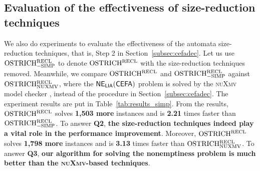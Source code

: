 \subsection{Evaluation of the effectiveness of size-reduction techniques}\label{subsec:size_reduction_eval}
We also do experiments to evaluate the effectiveness of the automata size-reduction techniques, that is, Step 2 in Section~\ref{subsec:cefadec}. 
Let us use $\rm OSTRICH^{RECL}_{\rm -SIMP}$ to denote $\rm OSTRICH^{RECL}$ with the size-reduction techniques removed. 
Meanwhile, we compare $\rm OSTRICH^{RECL}$ and $\rm OSTRICH^{RECL}_{\rm -SIMP}$ against $\rm OSTRICH^{RECL}_{\rm NUXMV}$, where the ${\sf NE_{LIA}(CEFA)}$ problem is solved by the \textsc{nuXmv} model checker \cite{nuxmv}, instead of the procedure in Section~\ref{subsec:cefadec}. 
The experiment results are put in Table~\ref{tab:results_simp}. 
From the results, $\rm OSTRICH^{RECL}$ solves \textbf{1,503 more} instances and is \textbf{2.21} times faster than $\rm OSTRICH^{RECL}_{\rm -SIMP}$. To answer \textbf{Q2}, \textbf{the size-reduction techniques indeed play a vital role in the performance improvement}. Moreover, $\rm OSTRICH^{RECL}$ solves \textbf{1,798 more} instances and is \textbf{3.13} times faster than $\rm OSTRICH^{RECL}_{\rm NUXMV}$. To answer \textbf{Q3}, \textbf{our algorithm for solving the nonemptiness problem is much better than the \textsc{nuXmv}-based techniques}.
